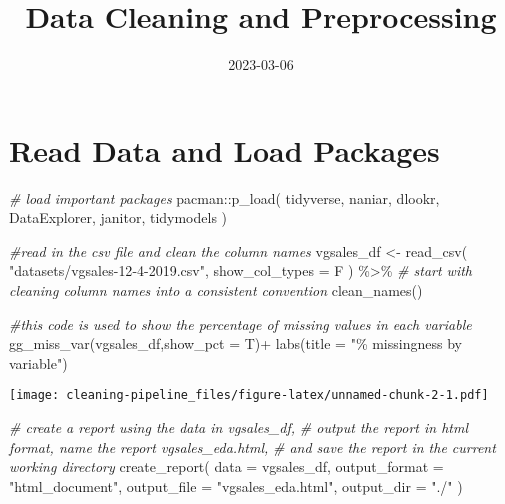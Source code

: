 \documentclass[
]{article}
\title{Data Cleaning and Preprocessing}
\author{}
\date{\vspace{-2.5em}2023-03-06}
\newenvironment{Shaded}{\begin{snugshade}}{\end{snugshade}}
\newcommand{\AttributeTok}[1]{\textcolor[rgb]{0.77,0.63,0.00}{#1}}
\newcommand{\CommentTok}[1]{\textcolor[rgb]{0.56,0.35,0.01}{\textit{#1}}}
\newcommand{\FunctionTok}[1]{\textcolor[rgb]{0.00,0.00,0.00}{#1}}
\newcommand{\NormalTok}[1]{#1}
\newcommand{\OtherTok}[1]{\textcolor[rgb]{0.56,0.35,0.01}{#1}}
\newcommand{\SpecialCharTok}[1]{\textcolor[rgb]{0.00,0.00,0.00}{#1}}
\newcommand{\StringTok}[1]{\textcolor[rgb]{0.31,0.60,0.02}{#1}}
\begin{document}
\maketitle

\hypertarget{read-data-and-load-packages}{%
\section{Read Data and Load
Packages}\label{read-data-and-load-packages}}

\begin{Shaded}
\begin{Highlighting}[]
\CommentTok{\# load important packages}
\NormalTok{pacman}\SpecialCharTok{::}\FunctionTok{p\_load}\NormalTok{(}
\NormalTok{  tidyverse, naniar, dlookr, DataExplorer, janitor, tidymodels}
\NormalTok{  )}


\CommentTok{\#read in the csv file and clean the column names}
\NormalTok{vgsales\_df }\OtherTok{\textless{}{-}} \FunctionTok{read\_csv}\NormalTok{(}
  \StringTok{"datasets/vgsales{-}12{-}4{-}2019.csv"}\NormalTok{, }\AttributeTok{show\_col\_types =}\NormalTok{ F}
\NormalTok{  ) }\SpecialCharTok{\%\textgreater{}\%}   
  \CommentTok{\# start with cleaning column names into a consistent convention}
  \FunctionTok{clean\_names}\NormalTok{()}
\end{Highlighting}
\end{Shaded}

\begin{Shaded}
\begin{Highlighting}[]
\CommentTok{\#this code is used to show the percentage of missing values in each variable}
\FunctionTok{gg\_miss\_var}\NormalTok{(vgsales\_df,}\AttributeTok{show\_pct =}\NormalTok{ T)}\SpecialCharTok{+}
  \FunctionTok{labs}\NormalTok{(}\AttributeTok{title =} \StringTok{"\% missingness by variable"}\NormalTok{)}
\end{Highlighting}
\end{Shaded}

\texttt{[image: cleaning-pipeline\_files/figure-latex/unnamed-chunk-2-1.pdf]}

\begin{Shaded}
\begin{Highlighting}[]
\CommentTok{\# create a report using the data in vgsales\_df, }
\CommentTok{\# output the report in html format, name the report vgsales\_eda.html, }
\CommentTok{\# and save the report in the current working directory}
\FunctionTok{create\_report}\NormalTok{(}
  \AttributeTok{data =}\NormalTok{ vgsales\_df, }
  \AttributeTok{output\_format =} \StringTok{"html\_document"}\NormalTok{, }
  \AttributeTok{output\_file =} \StringTok{"vgsales\_eda.html"}\NormalTok{, }
  \AttributeTok{output\_dir =} \StringTok{"./"}
\NormalTok{)}
\end{Highlighting}
\end{Shaded}
\end{document}
